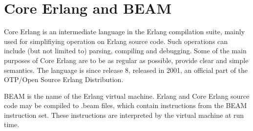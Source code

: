 \section{Core Erlang and BEAM}

Core Erlang \cite{CoreErlangIntro} is an intermediate language in the Erlang compilation suite, mainly used for simplifiying operation on Erlang source code. Such operations can include (but not limited to) parsing, compiling and debugging. Some of the main purposes of Core Erlang are to be as regular as possible, provide clear and simple semantics. The language is since release 8, released in 2001, an official part of the OTP/Open Source Erlang Distribution.

BEAM is the name of the Erlang virtual machine. Erlang and Core Erlang source code may be compiled to .beam files, which contain instructions from the BEAM instruction set. These instructions are interpreted by the virtual machine at run time.